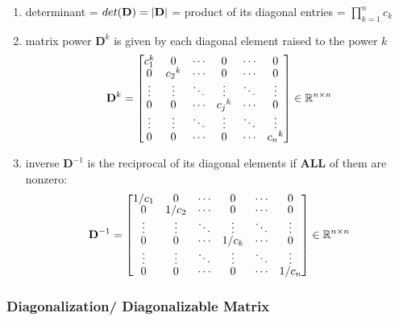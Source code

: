 \begin{enumerate}
    \item determinant = $det(\mathbf{D}) = \left| \mathbf{D} \right|$ = product of its diagonal entries = $\displaystyle \prod_{k=1}^{n} c_k$

    \item matrix power $\mathbf{D}^k$ is given by each diagonal element raised to the power $k$
    \[
        \displaystyle
        \renewcommand{\arraystretch}{0.6}
        \mathbf{D}^{k} = \begin{bmatrix}
            c_1^k & 0 & \cdots & 0 & \cdots & 0 \\
            0 & {c_2}^k & \cdots & 0 & \cdots & 0 \\
            \vdots & \vdots & \ddots & \vdots & \ddots & \vdots \\
            0 & 0 & \cdots & {c_j}^k & \cdots & 0 \\
            \vdots & \vdots & \ddots & \vdots & \ddots & \vdots \\
            0 & 0 & \cdots & 0 & \cdots & {c_n}^k \\
        \end{bmatrix} \in \mathbb{R}^{n\times n}
    \]

    \item inverse $\mathbf{D}^{-1}$ is the reciprocal of its diagonal elements if \textbf{ALL} of them are nonzero:
    \[
        \displaystyle
        \renewcommand{\arraystretch}{0.6}
        \mathbf{D}^{-1} = \begin{bmatrix}
            {1}/{c_1} & 0 & \cdots & 0 & \cdots & 0 \\
            0 & {1}/{c_2} & \cdots & 0 & \cdots & 0 \\
            \vdots & \vdots & \ddots & \vdots & \ddots & \vdots \\
            0 & 0 & \cdots & {1}/{c_k} & \cdots & 0 \\
            \vdots & \vdots & \ddots & \vdots & \ddots & \vdots \\
            0 & 0 & \cdots & 0 & \cdots & {1}/{c_n} \\
        \end{bmatrix} \in \mathbb{R}^{n\times n}
    \]  
\end{enumerate}


\subsubsection{Diagonalization/ Diagonalizable Matrix \cite{mfml-1}} \label{Diagonalization/ Diagonalizable Matrix}

